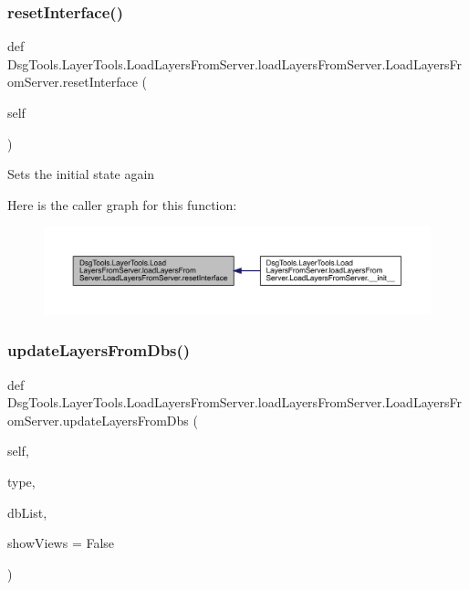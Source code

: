 \subsubsection{\texorpdfstring{reset\+Interface()}{resetInterface()}}
{\footnotesize\ttfamily def Dsg\+Tools.\+Layer\+Tools.\+Load\+Layers\+From\+Server.\+load\+Layers\+From\+Server.\+Load\+Layers\+From\+Server.\+reset\+Interface (\begin{DoxyParamCaption}\item[{}]{self }\end{DoxyParamCaption})}

\begin{DoxyVerb}Sets the initial state again
\end{DoxyVerb}
 Here is the caller graph for this function\+:
\nopagebreak
\begin{figure}[H]
\begin{center}
\leavevmode
\includegraphics[width=350pt]{class_dsg_tools_1_1_layer_tools_1_1_load_layers_from_server_1_1load_layers_from_server_1_1_load_layers_from_server_a46e887979f70b98f488e3b0aef33c214_icgraph}
\end{center}
\end{figure}
\mbox{\label{class_dsg_tools_1_1_layer_tools_1_1_load_layers_from_server_1_1load_layers_from_server_1_1_load_layers_from_server_a48c6d0c4e050cbc1d7b9d882b7c6facc}} 
\subsubsection{\texorpdfstring{update\+Layers\+From\+Dbs()}{updateLayersFromDbs()}}
{\footnotesize\ttfamily def Dsg\+Tools.\+Layer\+Tools.\+Load\+Layers\+From\+Server.\+load\+Layers\+From\+Server.\+Load\+Layers\+From\+Server.\+update\+Layers\+From\+Dbs (\begin{DoxyParamCaption}\item[{}]{self,  }\item[{}]{type,  }\item[{}]{db\+List,  }\item[{}]{show\+Views = {\ttfamily False} }\end{DoxyParamCaption})}

